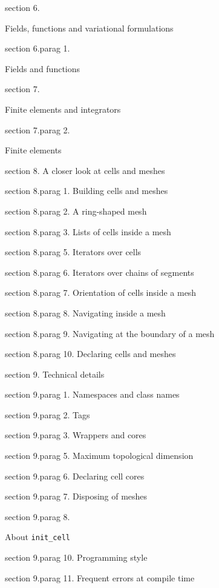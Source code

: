 \medskip\noindent
\numb section 6. Fields, functions and variational formulations

\numb section 6.\numb parag 1. Fields and functions

\medskip\noindent
\numb section 7. Finite elements and integrators

\numb section 7.\numb parag 2. Finite elements

\medskip\noindent
\numb section 8. A closer look at cells and meshes

\numb section 8.\numb parag 1. Building cells and meshes

\numb section 8.\numb parag 2. A ring-shaped mesh

\numb section 8.\numb parag 3. Lists of cells inside a mesh

\numb section 8.\numb parag 5. Iterators over cells

\numb section 8.\numb parag 6. Iterators over chains of segments

\numb section 8.\numb parag 7. Orientation of cells inside a mesh

\numb section 8.\numb parag 8. Navigating inside a mesh

\numb section 8.\numb parag 9. Navigating at the boundary of a mesh

\numb section 8.\numb parag 10. Declaring cells and meshes

\medskip\noindent
\numb section 9. Technical details

\numb section 9.\numb parag 1. Namespaces and class names

\numb section 9.\numb parag 2. Tags

\numb section 9.\numb parag 3. Wrappers and cores

\numb section 9.\numb parag 5. Maximum topological dimension

\numb section 9.\numb parag 6. Declaring cell cores

\numb section 9.\numb parag 7. Disposing of meshes

\numb section 9.\numb parag 8.
About {\tt init\_cell}

\numb section 9.\numb parag 10. Programming style

\numb section 9.\numb parag 11. Frequent errors at compile time

